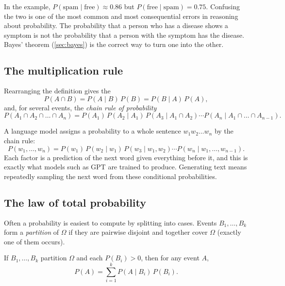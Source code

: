 \begin{pitfall}
In the example, $P(\text{spam} \mid \text{free}) \approx 0.86$ but
$P(\text{free} \mid \text{spam}) = 0.75$. Confusing the two is one of the most
common and most consequential errors in reasoning about probability. The
probability that a person who has a disease shows a symptom is not the
probability that a person with the symptom has the disease. Bayes' theorem
(\cref{sec:bayes}) is the correct way to turn one into the other.
\end{pitfall}

\subsection{The multiplication rule}

Rearranging the definition gives the 
\[
  P(A \cap B) = P(A \mid B)\,P(B) = P(B \mid A)\,P(A),
\]
and, for several events, the \emph{chain rule of probability}
\[
  P(A_1 \cap A_2 \cap \dots \cap A_n)
  = P(A_1)\,P(A_2 \mid A_1)\,P(A_3 \mid A_1 \cap A_2)\cdots
  P(A_n \mid A_1 \cap \dots \cap A_{n-1}).
\]

\begin{mlnote}
A language model assigns a probability to a whole sentence $w_1w_2\dots w_n$ by
the chain rule:
\[
  P(w_1, \dots, w_n) = P(w_1)\,P(w_2 \mid w_1)\,P(w_3 \mid w_1, w_2)\cdots
  P(w_n \mid w_1, \dots, w_{n-1}).
\]
Each factor is a prediction of the next word given everything before it, and
this is exactly what models such as GPT are trained to produce. Generating text
means repeatedly sampling the next word from these conditional probabilities.
\end{mlnote}

\subsection{The law of total probability}

Often a probability is easiest to compute by splitting into cases. Events
$B_1, \dots, B_k$ form a \emph{partition} of $\Omega$ if they are pairwise
disjoint and together cover $\Omega$ (exactly one of them occurs).

\begin{theorem}\label{thm:total-probability}
If $B_1, \dots, B_k$ partition $\Omega$ and each $P(B_i) > 0$, then for any
event $A$,
\[
  P(A) = \sum_{i=1}^k P(A \mid B_i)\,P(B_i).
\]
\end{theorem}

